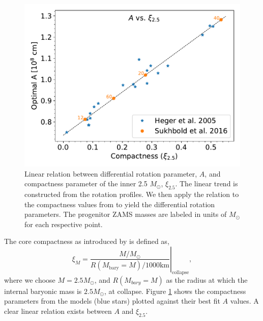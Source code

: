 \documentclass[twocolumn,times]{aastex62}  %
\begin{document}
\begin{figure}[t]
    \centering
    \includegraphics[scale=0.45]{figures/a_vs_compact.pdf}
    \caption{Linear relation between differential rotation parameter, $A$, and compactness parameter of the inner 2.5 $M_\odot$, $\xi_{2.5}$.  The linear trend is constructed from the \citet{heger:2005} rotation profiles.  We then apply the relation to the compactness values from \citet{Suk:2016} to yield the differential rotation parameters.  The progenitor ZAMS masses are labeled in units of $M_\odot$ for each respective point.}
    \label{fig:a_vs_comp}
\end{figure}

The core compactness as introduced by \citet{oconnor:2011} is defined as,
\begin{equation}
    \xi_M = \left.\frac{M/M_{\odot}}{R(M_\mathrm{bary}=M)/1000 \text{km}}\right\vert_\mathrm{collapse} ,
\end{equation} 
where we choose $M = 2.5 M_\odot$, and $R(M_{bary}=M) $ as the radius at which the internal baryonic mass is $2.5M_\odot$, at collapse.  
Figure \ref{fig:a_vs_comp} shows the compactness parameters from the \citet{heger:2005} models (blue stars) plotted against their best fit $A$ values.
A clear linear relation exists between $A$ and $\xi_{2.5}$.  
\end{document}
